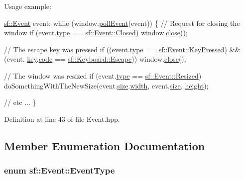 Usage example\-: 
\begin{DoxyCode}
\hyperlink{classsf_1_1Event}{sf::Event} event;
\textcolor{keywordflow}{while} (window.\hyperlink{classsf_1_1Window_a338e996585faf82e93069858e3b531b7}{pollEvent}(event))
\{
    \textcolor{comment}{// Request for closing the window}
    \textcolor{keywordflow}{if} (event.\hyperlink{classsf_1_1Event_adf2f8044f713fd9d6019077b0d1ffe0a}{type} == \hyperlink{classsf_1_1Event_af41fa9ed45c02449030699f671331d4aa316e4212e083f1dce79efd8d9e9c0a95}{sf::Event::Closed})
        window.\hyperlink{classsf_1_1Window_a99d1e030387b0c26f5995670504fe7b5}{close}();

    \textcolor{comment}{// The escape key was pressed}
    \textcolor{keywordflow}{if} ((event.\hyperlink{classsf_1_1Event_adf2f8044f713fd9d6019077b0d1ffe0a}{type} == \hyperlink{classsf_1_1Event_af41fa9ed45c02449030699f671331d4aac3c7abfaa98c73bfe6be0b57df09c71b}{sf::Event::KeyPressed}) && (event.
      \hyperlink{classsf_1_1Event_a45b92fc6757ca7c193f06b302e424ab0}{key}.\hyperlink{structsf_1_1Event_1_1KeyEvent_a2879fdab8a68cb1c6ecc45730a2d0e61}{code} == \hyperlink{classsf_1_1Keyboard_acb4cacd7cc5802dec45724cf3314a142a64b7ecb543c5d03bec8383dde123c95d}{sf::Keyboard::Escape}))
        window.\hyperlink{classsf_1_1Window_a99d1e030387b0c26f5995670504fe7b5}{close}();

    \textcolor{comment}{// The window was resized}
    \textcolor{keywordflow}{if} (event.\hyperlink{classsf_1_1Event_adf2f8044f713fd9d6019077b0d1ffe0a}{type} == \hyperlink{classsf_1_1Event_af41fa9ed45c02449030699f671331d4aa67fd26d7e520bc6722db3ff47ef24941}{sf::Event::Resized})
        doSomethingWithTheNewSize(event.\hyperlink{classsf_1_1Event_a85dae56a377eeffd39183c3f6fc96cb9}{size}.\hyperlink{structsf_1_1Event_1_1SizeEvent_a20ea1b78c9bb1604432f8f0067bbfd94}{width}, event.\hyperlink{classsf_1_1Event_a85dae56a377eeffd39183c3f6fc96cb9}{size}.
      \hyperlink{structsf_1_1Event_1_1SizeEvent_af0f76a599d5f48189cb8d78d4e5facdb}{height});

    \textcolor{comment}{// etc ...}
\}
\end{DoxyCode}
 

Definition at line 43 of file Event.\-hpp.



\subsection{Member Enumeration Documentation}
\hypertarget{classsf_1_1Event_af41fa9ed45c02449030699f671331d4a}{
\subsubsection[{Event\-Type}]{\setlength{\rightskip}{0pt plus 5cm}enum {\bf sf\-::\-Event\-::\-Event\-Type}}}\label{classsf_1_1Event_af41fa9ed45c02449030699f671331d4a}


